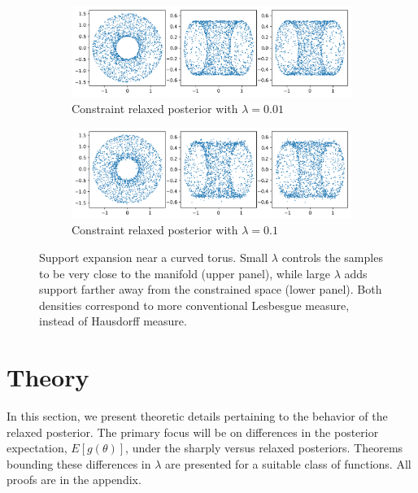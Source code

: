\documentclass[10pt,fleqn]{article}
\DeclareMathOperator{\1}{\mathbbm{1}} \DeclareMathOperator{\bigO}{\mc O}
\begin{document}
\begin{figure}[H]
\begin{subfigure}[b]{1\textwidth}
 \includegraphics[width=1\textwidth]{torus_001.png}
 \caption{Constraint relaxed posterior with $\lambda
 = 0.01$}
\end{subfigure}
\begin{subfigure}[b]{1\textwidth}
 \includegraphics[width=1\textwidth]{torus_005.png}
 \caption{Constraint relaxed posterior with $\lambda
 = 0.1$}
\end{subfigure}
 \caption{Support expansion near a curved torus. Small $\lambda$ controls the samples to be very close to the manifold (upper panel), while large $\lambda$ adds support farther away from the constrained space (lower panel). Both densities correspond to more conventional Lesbesgue measure, instead of Hausdorff measure.
 \label{fig:torus}}
\end{figure}




\section{Theory}

In this section, we present theoretic details pertaining to the behavior of the relaxed posterior.  The primary focus will be on differences in the posterior expectation, $E[g(\theta)]$, under the sharply versus relaxed posteriors.  Theorems bounding these differences in $\lambda$ are presented for a suitable class of functions.  All proofs are in the appendix. 
\end{document}
